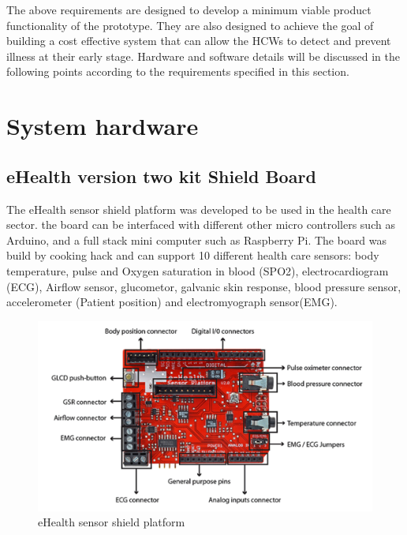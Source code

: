 The above requirements are designed to develop a minimum viable product functionality of the prototype. They are also designed to achieve the goal of building a cost effective system that can allow the HCWs to detect and prevent illness at their early stage. Hardware and software details will be discussed in the following points according to the requirements specified in this section. 

\section{System hardware}
\subsection{eHealth version two kit Shield Board}

The eHealth sensor shield platform was developed to be used in the health care sector. the board can be interfaced with different other micro controllers such as Arduino, and a full stack mini computer such as Raspberry Pi. The board was build by cooking hack and can support 10 different health care sensors: body temperature, pulse and Oxygen saturation in blood (SPO2), electrocardiogram (ECG), Airflow sensor, glucometor, galvanic skin response, blood pressure sensor, accelerometer (Patient position) and electromyograph sensor(EMG).
\begin{figure}[H]
\centering
\includegraphics[width=15cm]{images/ehealth_kit.png} %
\caption{eHealth sensor shield platform}
\label{fig:fig-eg}
\end{figure}

